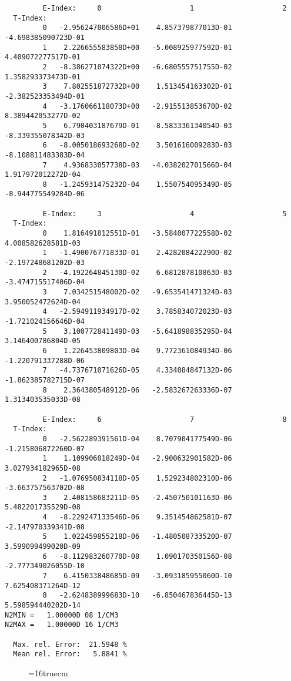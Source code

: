 \documentclass[12pt,dvipdfmx]{article}
\begin{document}
\begin{small}\begin{verbatim}
         E-Index:     0                     1                     2
  T-Index:
         0   -2.956247006586D+01    4.857379877013D-01   -4.698385090723D-01
         1    2.226655583858D+00   -5.008925977592D-01    4.409072277517D-01
         2   -8.386271074322D+00   -6.680555751755D-02    1.358293373473D-01
         3    7.802551872732D+00    1.513454163302D-01   -2.382523353494D-01
         4   -3.176066118073D+00   -2.915513853670D-02    8.389442053277D-02
         5    6.790403187679D-01   -8.583336134054D-03   -8.339355078342D-03
         6   -8.005018693268D-02    3.501616009283D-03   -8.108811483383D-04
         7    4.936833057738D-03   -4.038202701566D-04    1.917972012272D-04
         8   -1.245931475232D-04    1.550754095349D-05   -8.944775549284D-06

         E-Index:     3                     4                     5
  T-Index:
         0    1.816491812551D-01   -3.584007722558D-02    4.008582628581D-03
         1   -1.490076771833D-01    2.428208422290D-02   -2.197248681202D-03
         2   -4.192264845130D-02    6.681287810863D-03   -3.474715517406D-04
         3    7.034251548002D-02   -9.653541471324D-03    3.950052472624D-04
         4   -2.594911934917D-02    3.785834072023D-03   -1.721024156646D-04
         5    3.100772841149D-03   -5.641898835295D-04    3.146400786804D-05
         6    1.226453809803D-04    9.772361084934D-06   -1.220791337288D-06
         7   -4.737671071626D-05    4.334084847132D-06   -1.862385782715D-07
         8    2.364380548912D-06   -2.583267263336D-07    1.313403535033D-08

         E-Index:     6                     7                     8
  T-Index:
         0   -2.562289391561D-04    8.707904177549D-06   -1.215806872260D-07
         1    1.109906018249D-04   -2.900632901582D-06    3.027934182965D-08
         2   -1.076950834118D-05    1.529234802310D-06   -3.663757563702D-08
         3    2.408158683211D-05   -2.450750101163D-06    5.482201735529D-08
         4   -8.229247133546D-06    9.351454862581D-07   -2.147970339341D-08
         5    1.022459855218D-06   -1.480508733520D-07    3.599099499020D-09
         6   -8.112983260770D-08    1.090170350156D-08   -2.777349026055D-10
         7    6.415033848685D-09   -3.093185955060D-10    7.625408371264D-12
         8   -2.624838999683D-10   -6.850467836445D-13    5.598594440202D-14
N2MIN =   1.00000D 08 1/CM3
N2MAX =   1.00000D 16 1/CM3

  Max. rel. Error:  21.5948 %
  Mean rel. Error:   5.8841 %

\end{verbatim}\end{small}
\begin{figure} \label{2.3.13d}
\epsfxsize=16truecm
\end{figure}
\newpage
\end{document}
